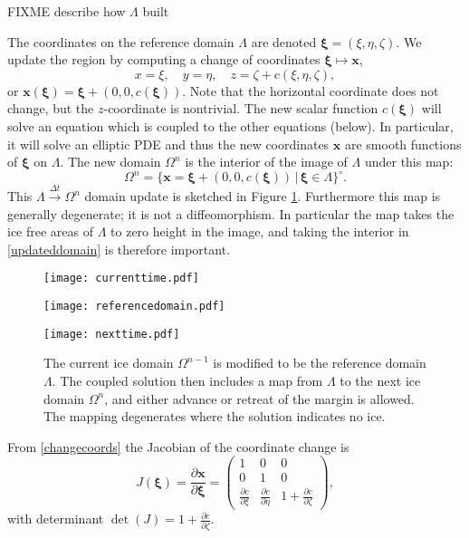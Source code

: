 \documentclass[letterpaper,final,12pt,reqno]{amsart}
\newcommand{\bx}{\mathbf{x}}
\newcommand{\bxi}{\bm{\xi}}
\begin{document}
FIXME describe how $\Lambda$ built

The coordinates on the reference domain $\Lambda$ are denoted $\bxi=(\xi,\eta,\zeta)$.  We update the region by computing a change of coordinates $\bxi \mapsto \bx$,
\begin{equation}
x=\xi, \quad y=\eta, \quad z=\zeta+c(\xi,\eta,\zeta), \label{changecoords}
\end{equation}
or $\bx(\bxi) = \bxi + (0,0,c(\bxi))$.  Note that the horizontal coordinate does not change, but the $z$-coordinate is nontrivial.  The new scalar function $c(\bxi)$ will solve an equation which is coupled to the other equations (below).  In particular, it will solve an elliptic PDE and thus the new coordinates $\bx$ are smooth functions of $\bxi$ on $\Lambda$.  The new domain $\Omega^n$ is the interior of the image of $\Lambda$ under this map:
\begin{equation}
\Omega^n = \{\bx=\bxi + (0,0,c(\bxi)) \,\big|\, \bxi \in \Lambda\}^\circ. \label{updateddomain}
\end{equation}
This $\Lambda \stackrel{\Delta t}{\to} \Omega^n$ domain update is sketched in Figure \ref{fig:domainupdate}.  Furthermore this map is generally degenerate; it is not a diffeomorphism.  In particular the map takes the ice free areas of $\Lambda$ to zero height in the image, and taking the interior in \eqref{updateddomain} is therefore important.

\begin{figure}[h]
\begin{center}
\texttt{[image: currenttime.pdf]}
\vspace{-3mm}

\texttt{[image: referencedomain.pdf]}

\texttt{[image: nexttime.pdf]}
\end{center}
\caption{The current ice domain $\Omega^{n-1}$ is modified to be the reference domain $\Lambda$.  The coupled solution then includes a map from $\Lambda$ to the next ice domain $\Omega^n$, and either advance or retreat of the margin is allowed.  The mapping degenerates where the solution indicates no ice.}
\label{fig:domainupdate}
\end{figure}

From \eqref{changecoords} the Jacobian of the coordinate change is
\begin{equation}
J(\bxi) = \frac{\partial \bx}{\partial \bm{\xi}} = \begin{pmatrix} 1 & 0 & 0 \\  0 & 1 & 0 \\ \frac{\partial c}{\partial \xi} & \frac{\partial c}{\partial \eta} & 1+\frac{\partial c}{\partial \zeta} \end{pmatrix}, \label{jacchange}
\end{equation}
with determinant $\det(J)=1+\frac{\partial c}{\partial \zeta}$.
\end{document}
